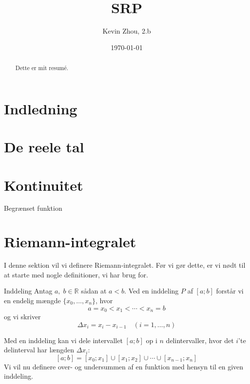 \documentclass{article}
\title{SRP}
\author{Kevin Zhou, 2.b}
\date{\today}
\begin{document}

\begin{abstract}
  Dette er mit resumé.
\end{abstract}

\tableofcontents
\thispagestyle{empty}
\newpage
\section{Indledning}
  \label{sec:Indledning}

\section{De reele tal}%
\label{sec:De reele tal}


\section{Kontinuitet}%
\label{sec:Kontinuitet}

\begin{definition}[colbacktitle=red!75!black]{Begrænset funktion}{}
  
\end{definition}
\section{Riemann-integralet}%
\label{sec:Riemann-integralet}
I denne sektion vil vi definere Riemann-integralet.
Før vi gør dette, er vi nødt til at starte med nogle definitioner, vi har brug for.
\begin{definition}[colbacktitle=red!75!black]{Inddeling}{}
  Antag $a,\;b \in \mathbb{R}$ sådan at $a <b$.
  Ved en inddeling $P$ af $[a;b]$ forstår vi en endelig mængde $\{x_0,\dotsc, x_n\}$, hvor
  \[
  a=x_0<x_1<\cdots<x_n=b
  \] 
  og vi skriver 
  \[
  \Delta x_i=x_i-x_{i-1} \quad (i=1,\ldots ,n)
  \]  
\end{definition}
Med en inddeling kan vi dele intervallet $[a;b]$ op i $n$ delintervaller, hvor det $i$'te delinterval har længden $\Delta x_i$:
\[
[a;b]=[x_0;x_1] \cup [x_1;x_2]\cup \cdots \cup [x _{n-1};x_n]
\] 
Vi vil nu definere over- og undersummen af en funktion med hensyn til en given inddeling.
\end{document}

